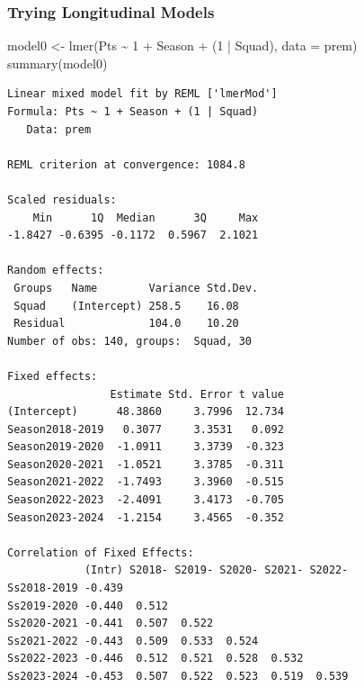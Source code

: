 \documentclass[
  letterpaper,
  DIV=11,
  numbers=noendperiod]{scrartcl}
\newenvironment{Shaded}{\begin{snugshade}}{\end{snugshade}}
\newcommand{\AttributeTok}[1]{\textcolor[rgb]{0.40,0.45,0.13}{#1}}
\newcommand{\DecValTok}[1]{\textcolor[rgb]{0.68,0.00,0.00}{#1}}
\newcommand{\FunctionTok}[1]{\textcolor[rgb]{0.28,0.35,0.67}{#1}}
\newcommand{\NormalTok}[1]{\textcolor[rgb]{0.00,0.23,0.31}{#1}}
\newcommand{\OtherTok}[1]{\textcolor[rgb]{0.00,0.23,0.31}{#1}}
\newcommand{\SpecialCharTok}[1]{\textcolor[rgb]{0.37,0.37,0.37}{#1}}
\begin{document}
\subsubsection{Trying Longitudinal
Models}\label{trying-longitudinal-models}

\begin{Shaded}
\begin{Highlighting}[]
\NormalTok{model0 }\OtherTok{\textless{}{-}} \FunctionTok{lmer}\NormalTok{(Pts }\SpecialCharTok{\textasciitilde{}} \DecValTok{1} \SpecialCharTok{+}\NormalTok{ Season }\SpecialCharTok{+}\NormalTok{ (}\DecValTok{1} \SpecialCharTok{|}\NormalTok{ Squad), }\AttributeTok{data =}\NormalTok{ prem)}
\FunctionTok{summary}\NormalTok{(model0)}
\end{Highlighting}
\end{Shaded}

\begin{verbatim}
Linear mixed model fit by REML ['lmerMod']
Formula: Pts ~ 1 + Season + (1 | Squad)
   Data: prem

REML criterion at convergence: 1084.8

Scaled residuals: 
    Min      1Q  Median      3Q     Max 
-1.8427 -0.6395 -0.1172  0.5967  2.1021 

Random effects:
 Groups   Name        Variance Std.Dev.
 Squad    (Intercept) 258.5    16.08   
 Residual             104.0    10.20   
Number of obs: 140, groups:  Squad, 30

Fixed effects:
                Estimate Std. Error t value
(Intercept)      48.3860     3.7996  12.734
Season2018-2019   0.3077     3.3531   0.092
Season2019-2020  -1.0911     3.3739  -0.323
Season2020-2021  -1.0521     3.3785  -0.311
Season2021-2022  -1.7493     3.3960  -0.515
Season2022-2023  -2.4091     3.4173  -0.705
Season2023-2024  -1.2154     3.4565  -0.352

Correlation of Fixed Effects:
            (Intr) S2018- S2019- S2020- S2021- S2022-
Ss2018-2019 -0.439                                   
Ss2019-2020 -0.440  0.512                            
Ss2020-2021 -0.441  0.507  0.522                     
Ss2021-2022 -0.443  0.509  0.533  0.524              
Ss2022-2023 -0.446  0.512  0.521  0.528  0.532       
Ss2023-2024 -0.453  0.507  0.522  0.523  0.519  0.539
\end{verbatim}
\end{document}

